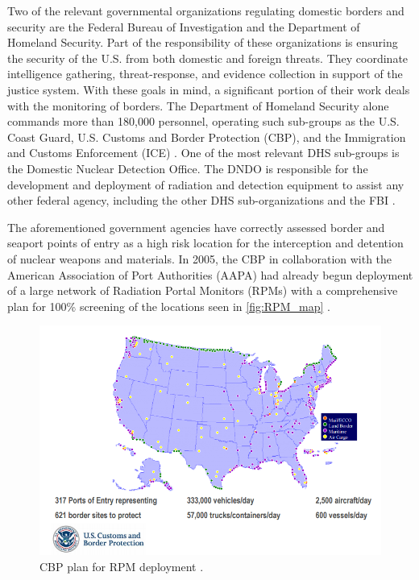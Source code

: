 \documentclass{report}
\begin{document}
Two of the relevant governmental organizations regulating domestic borders and security are the Federal Bureau of Investigation  and the Department of Homeland Security. Part of the responsibility of these organizations is ensuring the security of the U.S. from both domestic and foreign threats. They coordinate intelligence gathering, threat-response, and evidence collection in support of the justice system. With these goals in mind, a significant portion of their work deals with the monitoring of borders. The Department of Homeland Security alone commands more than 180,000 personnel, operating such sub-groups as the U.S. Coast Guard, U.S. Customs and Border Protection (CBP), and the Immigration and Customs Enforcement (ICE) \cite{Robb2005}. One of the most relevant DHS sub-groups is the Domestic Nuclear Detection Office. The DNDO is responsible for the development and deployment of radiation and detection equipment to assist any other federal agency, including the other DHS sub-organizations and the FBI \cite{UnitedStatesGovernmentAccountabilityOffice2013}. 

The aforementioned government agencies have correctly assessed border and seaport points of entry as a high risk location for the interception and detention of nuclear weapons and materials. In 2005, the CBP in collaboration with the American Association of Port Authorities (AAPA) had already begun deployment of a large network of Radiation Portal Monitors (RPMs) with a comprehensive plan for 100\% screening of the locations seen in \autoref{fig:RPM_map} \cite{Simmons2005}. 


\begin{figure}
 \centering
 \includegraphics[trim = 0cm 0cm 0cm 0cm, clip,scale=0.55]{./figures/RPM_map.png}
   \caption{CBP plan for RPM deployment \cite{Simmons2005}.}
     \label{fig:RPM_map}
\end{figure}
\end{document}
